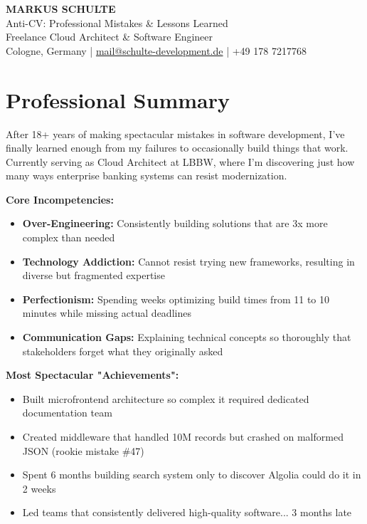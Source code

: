 \documentclass[11pt,a4paper]{article}
\begin{document}
\begin{center}
{\Huge\bfseries\sffamily\color{darkblue} MARKUS SCHULTE}\\[0.5em]
{\Large\sffamily Anti-CV: Professional Mistakes \& Lessons Learned}\\[0.5em]
{\sffamily Freelance Cloud Architect \& Software Engineer}\\[0.3em]
{\color{gray}\sffamily Cologne, Germany | \href{mailto:mail@schulte-development.de}{mail@schulte-development.de} | +49 178 7217768}
\end{center}

\vspace{1em}

\section*{Professional Summary}

After 18+ years of making spectacular mistakes in software development, I've finally learned enough from my failures to occasionally build things that work. Currently serving as Cloud Architect at LBBW, where I'm discovering just how many ways enterprise banking systems can resist modernization.

\textbf{Core Incompetencies:}
\begin{itemize}[leftmargin=1.5em,itemsep=0.2em]
\item \textbf{Over-Engineering:} Consistently building solutions that are 3x more complex than needed
\item \textbf{Technology Addiction:} Cannot resist trying new frameworks, resulting in diverse but fragmented expertise
\item \textbf{Perfectionism:} Spending weeks optimizing build times from 11 to 10 minutes while missing actual deadlines
\item \textbf{Communication Gaps:} Explaining technical concepts so thoroughly that stakeholders forget what they originally asked
\end{itemize}

\textbf{Most Spectacular "Achievements":}
\begin{itemize}[leftmargin=1.5em,itemsep=0.2em]
\item Built microfrontend architecture so complex it required dedicated documentation team
\item Created middleware that handled 10M records but crashed on malformed JSON (rookie mistake \#47)
\item Spent 6 months building search system only to discover Algolia could do it in 2 weeks
\item Led teams that consistently delivered high-quality software... 3 months late
\end{itemize}
\end{document}
